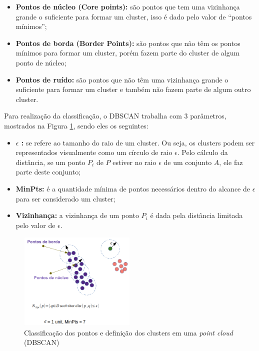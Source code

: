     \begin{itemize}
        \item \textbf{Pontos de núcleo (Core points):} são pontos que tem uma vizinhança grande o suficiente para formar um cluster, isso é dado pelo valor de “pontos mínimos”;
        \item \textbf{Pontos de borda (Border Points):} são pontos que não têm os pontos mínimos para formar um cluster, porém fazem parte do cluster de algum ponto de núcleo;
        \item \textbf{Pontos de ruído:} são pontos que não têm uma vizinhança grande o suficiente para formar um cluster e também não fazem parte de algum outro cluster. 
    \end{itemize}
    
    Para realização da classificação, o DBSCAN trabalha com 3 parâmetros, mostrados na Figura \ref{fig:classificacaoPontosDbScan}, sendo eles os seguintes:
    
    \begin{itemize}
        \item \textbf{$\epsilon$ :} se refere ao tamanho do raio de um cluster. Ou seja, os clusters podem ser representados visualmente como um círculo de raio $\epsilon$. Pelo cálculo da distância, se um ponto $P_i$  de  $P$ estiver no raio $\epsilon$ de um conjunto $A$, ele faz parte deste conjunto; 
        \item \textbf{MinPts:} é a quantidade mínima de pontos necessários dentro do alcance de $\epsilon$ para ser considerado um cluster;
        \item \textbf{Vizinhança:} a vizinhança de um ponto $P_i$ é dada pela distância limitada pelo valor de $\epsilon$.
    \end{itemize}
    
        \begin{figure}[h]
           \centering
           \includegraphics[width=0.5\textwidth]{imagens/classificacaoPontosDbScan.png} 
           \caption{Classificação dos pontos e definição dos clusters em uma \textit{point cloud} (DBSCAN) \cite{harman_2020_dbscan}}
           \label{fig:classificacaoPontosDbScan}
        \end{figure}
    
